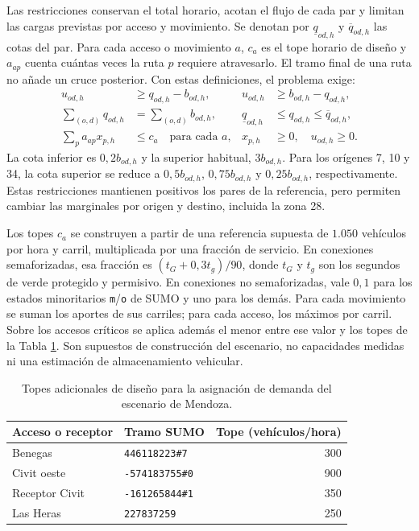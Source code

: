 Las restricciones conservan el total horario, acotan el flujo de cada par y limitan las cargas previstas por acceso y movimiento. Se denotan por $\underline q_{od,h}$ y $\overline q_{od,h}$ las cotas del par. Para cada acceso o movimiento $a$, $c_a$ es el tope horario de diseño y $a_{ap}$ cuenta cuántas veces la ruta $p$ requiere atravesarlo. El tramo final de una ruta no añade un cruce posterior. Con estas definiciones, el problema exige:
\begin{equation}
\begin{aligned}
 u_{od,h}&\ge q_{od,h}-b_{od,h}, &
 u_{od,h}&\ge b_{od,h}-q_{od,h},\\
 \sum_{(o,d)}q_{od,h}&=\sum_{(o,d)}b_{od,h}, &
 \underline q_{od,h}&\le q_{od,h}\le\overline q_{od,h},\\
 \sum_p a_{ap}x_{p,h}&\le c_a\quad\text{para cada }a, &
 x_{p,h}&\ge0,\quad u_{od,h}\ge0.
\end{aligned}
\label{eq:mendoza_balance_restricciones}
\end{equation}
La cota inferior es $0{,}2b_{od,h}$ y la superior habitual, $3b_{od,h}$. Para los orígenes 7, 10 y 34, la cota superior se reduce a $0{,}5b_{od,h}$, $0{,}75b_{od,h}$ y $0{,}25b_{od,h}$, respectivamente. Estas restricciones mantienen positivos los pares de la referencia, pero permiten cambiar las marginales por origen y destino, incluida la zona 28.

Los topes $c_a$ se construyen a partir de una referencia supuesta de $1.050$ vehículos por hora y carril, multiplicada por una fracción de servicio. En conexiones semaforizadas, esa fracción es $(t_G+0{,}3t_g)/90$, donde $t_G$ y $t_g$ son los segundos de verde protegido y permisivo. En conexiones no semaforizadas, vale $0{,}1$ para los estados minoritarios \texttt{m}/\texttt{o} de SUMO y uno para los demás. Para cada movimiento se suman los aportes de sus carriles; para cada acceso, los máximos por carril. Sobre los accesos críticos se aplica además el menor entre ese valor y los topes de la Tabla \ref{tab:mendoza_topes_diseno}. Son supuestos de construcción del escenario, no capacidades medidas ni una estimación de almacenamiento vehicular.

\begin{table}[H]\centering\small
\caption{Topes adicionales de diseño para la asignación de demanda del escenario de Mendoza.}
\label{tab:mendoza_topes_diseno}
\begin{tabular}{@{}llr@{}}\hline
Acceso o receptor & Tramo SUMO & Tope (vehículos/hora) \\\hline
Benegas & \texttt{446118223\#7} & 300 \\
Civit oeste & \texttt{-574183755\#0} & 900 \\
Receptor Civit & \texttt{-161265844\#1} & 350 \\
Las Heras & \texttt{227837259} & 250 \\\hline
\end{tabular}
\end{table}

